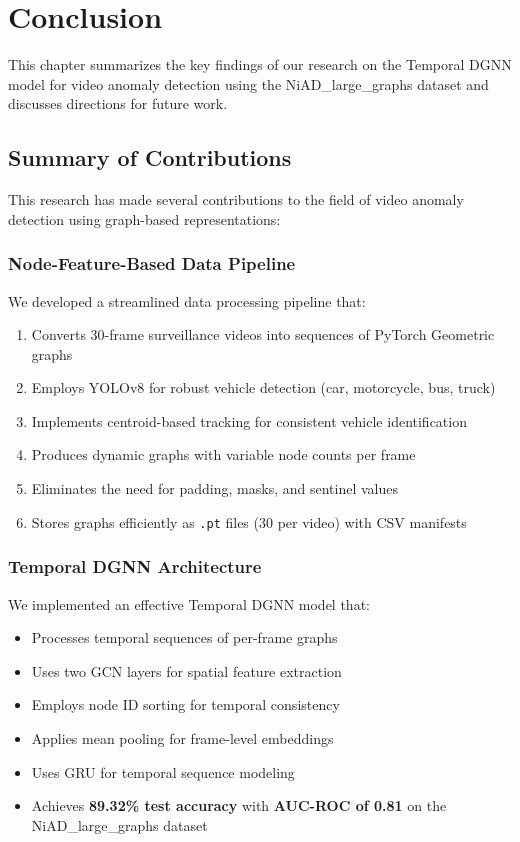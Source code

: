 
\chapter{Conclusion}
\label{ch:conclusion}

This chapter summarizes the key findings of our research on the Temporal DGNN model for video anomaly detection using the NiAD\_large\_graphs dataset and discusses directions for future work.

\section{Summary of Contributions}

This research has made several contributions to the field of video anomaly detection using graph-based representations:

\subsection{Node-Feature-Based Data Pipeline}

We developed a streamlined data processing pipeline that:
\begin{enumerate}
    \item Converts 30-frame surveillance videos into sequences of PyTorch Geometric graphs
    \item Employs YOLOv8 for robust vehicle detection (car, motorcycle, bus, truck)
    \item Implements centroid-based tracking for consistent vehicle identification
    \item Produces dynamic graphs with variable node counts per frame
    \item Eliminates the need for padding, masks, and sentinel values
    \item Stores graphs efficiently as \texttt{.pt} files (30 per video) with CSV manifests
\end{enumerate}

\subsection{Temporal DGNN Architecture}

We implemented an effective Temporal DGNN model that:
\begin{itemize}
    \item Processes temporal sequences of per-frame graphs
    \item Uses two GCN layers for spatial feature extraction
    \item Employs node ID sorting for temporal consistency
    \item Applies mean pooling for frame-level embeddings
    \item Uses GRU for temporal sequence modeling
    \item Achieves \textbf{89.32\% test accuracy} with \textbf{AUC-ROC of 0.81} on the NiAD\_large\_graphs dataset
\end{itemize}

